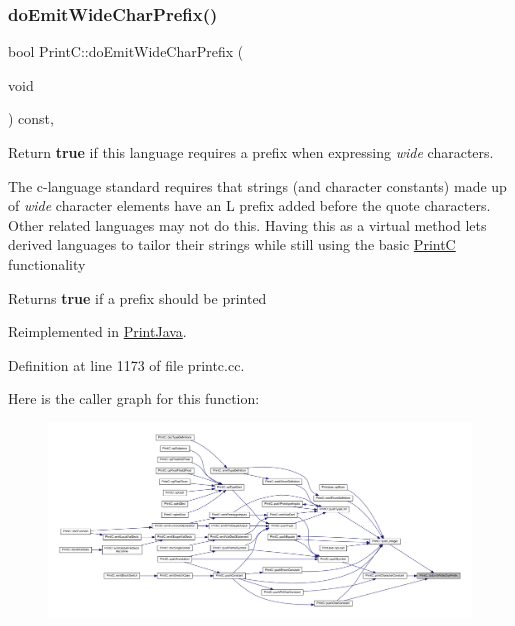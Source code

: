 \subsubsection{\texorpdfstring{doEmitWideCharPrefix()}{doEmitWideCharPrefix()}}
{\footnotesize\ttfamily bool Print\+C\+::do\+Emit\+Wide\+Char\+Prefix (\begin{DoxyParamCaption}\item[{void}]{ }\end{DoxyParamCaption}) const\hspace{0.3cm}{\ttfamily [protected]}, {\ttfamily [virtual]}}



Return {\bfseries{true}} if this language requires a prefix when expressing {\itshape wide} characters. 

The c-\/language standard requires that strings (and character constants) made up of {\itshape wide} character elements have an \textquotesingle{}L\textquotesingle{} prefix added before the quote characters. Other related languages may not do this. Having this as a virtual method lets derived languages to tailor their strings while still using the basic \mbox{\hyperlink{class_print_c}{PrintC}} functionality \begin{DoxyReturn}{Returns}
{\bfseries{true}} if a prefix should be printed 
\end{DoxyReturn}


Reimplemented in \mbox{\hyperlink{class_print_java_a4f4aba29ed21a74bafe52eb5cc3fe904}{Print\+Java}}.



Definition at line 1173 of file printc.\+cc.

Here is the caller graph for this function\+:
\nopagebreak
\begin{figure}[H]
\begin{center}
\leavevmode
\includegraphics[width=350pt]{class_print_c_a3ccbcccc1706e4d29930ac2fdeadc19a_icgraph}
\end{center}
\end{figure}
\mbox{\label{class_print_c_a949cd93dbebadf75fad1befc87776285}} 
